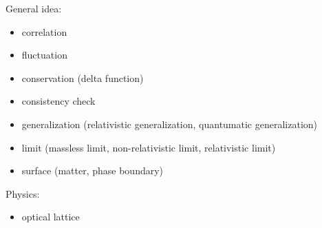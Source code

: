 General idea:
\begin{itemize}
    \item correlation
    \item fluctuation
    \item conservation (delta function)
    \item consistency check
    \item generalization (relativistic generalization, quantumatic generalization)
    \item limit (massless limit, non-relativistic limit, relativistic limit)
    \item surface (matter, phase boundary)
\end{itemize}



Physics:
\begin{itemize}
    \item optical lattice
\end{itemize}
